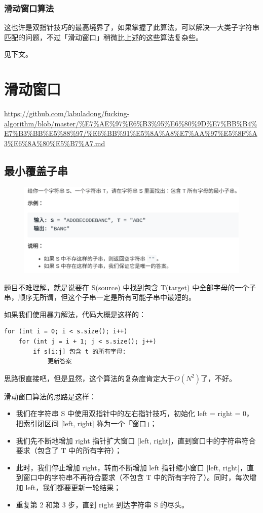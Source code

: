 \documentclass[12pt]{article}
\begin{document}
\subsubsection{滑动窗口算法}
这也许是双指针技巧的最高境界了，如果掌握了此算法，可以解决一大类子字符串匹配的问题，不过「滑动窗口」稍微比上述的这些算法复杂些。

见下文。

\section{滑动窗口}
\url{https://github.com/labuladong/fucking-algorithm/blob/master/%E7%AE%97%E6%B3%95%E6%80%9D%E7%BB%B4%E7%B3%BB%E5%88%97/%E6%BB%91%E5%8A%A8%E7%AA%97%E5%8F%A3%E6%8A%80%E5%B7%A7.md}

\subsection{最小覆盖子串}
\begin{figure}[H]
    \centering
    \includegraphics[width=.8\textwidth]{fig/Sliding_Window_1.png}
\end{figure}
题目不难理解，就是说要在 S(source) 中找到包含 T(target) 中全部字母的一个子串，顺序无所谓，但这个子串一定是所有可能子串中最短的。

如果我们使用暴力解法，代码大概是这样的：
\begin{lstlisting}
for (int i = 0; i < s.size(); i++)
    for (int j = i + 1; j < s.size(); j++)
        if s[i:j] 包含 t 的所有字母:
            更新答案
\end{lstlisting}

思路很直接吧，但是显然，这个算法的复杂度肯定大于$ O(N^2)$了，不好。

滑动窗口算法的思路是这样：
\begin{itemize}
\setlength{\itemsep}{0pt}
\setlength{\parsep}{0pt}
\setlength{\parskip}{0pt}
    \item 我们在字符串 S 中使用双指针中的左右指针技巧，初始化 left = right = 0，把索引闭区间 [left, right] 称为一个「窗口」；
    \item 我们先不断地增加 right 指针扩大窗口 [left, right]，直到窗口中的字符串符合要求（包含了 T 中的所有字符）；
    \item 此时，我们停止增加 right，转而不断增加 left 指针缩小窗口 [left, right]，直到窗口中的字符串不再符合要求（不包含 T 中的所有字符了）。同时，每次增加 left，我们都要更新一轮结果；
    \item 重复第 2 和第 3 步，直到 right 到达字符串 S 的尽头。
\end{itemize}
\end{document}
